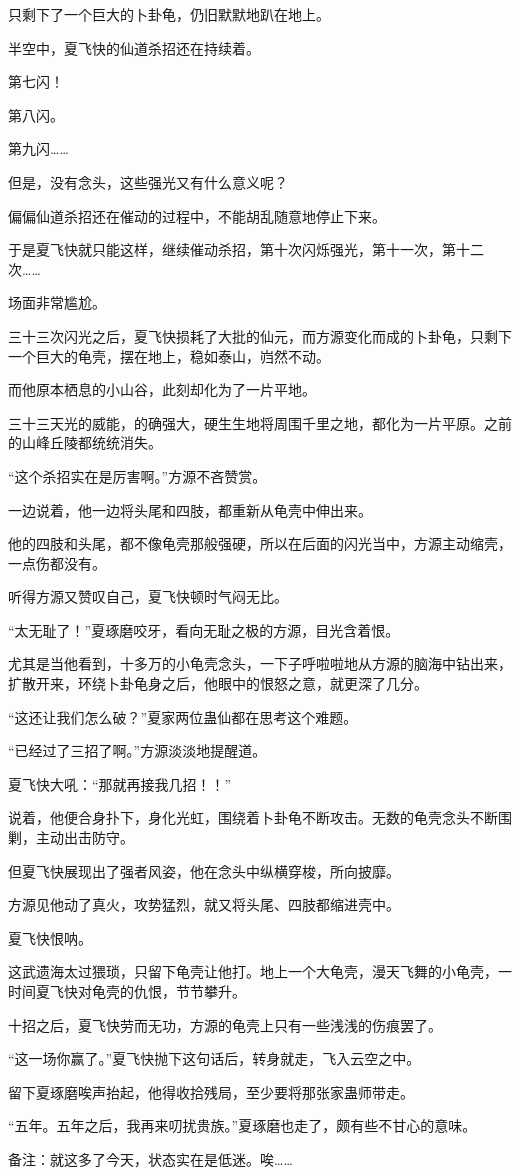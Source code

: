 \begin{this_body}
只剩下了一个巨大的卜卦龟，仍旧默默地趴在地上。

半空中，夏飞快的仙道杀招还在持续着。

第七闪！

第八闪。

第九闪……

但是，没有念头，这些强光又有什么意义呢？

偏偏仙道杀招还在催动的过程中，不能胡乱随意地停止下来。

于是夏飞快就只能这样，继续催动杀招，第十次闪烁强光，第十一次，第十二次……

场面非常尴尬。

三十三次闪光之后，夏飞快损耗了大批的仙元，而方源变化而成的卜卦龟，只剩下一个巨大的龟壳，摆在地上，稳如泰山，岿然不动。

而他原本栖息的小山谷，此刻却化为了一片平地。

三十三天光的威能，的确强大，硬生生地将周围千里之地，都化为一片平原。之前的山峰丘陵都统统消失。

“这个杀招实在是厉害啊。”方源不吝赞赏。

一边说着，他一边将头尾和四肢，都重新从龟壳中伸出来。

他的四肢和头尾，都不像龟壳那般强硬，所以在后面的闪光当中，方源主动缩壳，一点伤都没有。

听得方源又赞叹自己，夏飞快顿时气闷无比。

“太无耻了！”夏琢磨咬牙，看向无耻之极的方源，目光含着恨。

尤其是当他看到，十多万的小龟壳念头，一下子呼啦啦地从方源的脑海中钻出来，扩散开来，环绕卜卦龟身之后，他眼中的恨怒之意，就更深了几分。

“这还让我们怎么破？”夏家两位蛊仙都在思考这个难题。

“已经过了三招了啊。”方源淡淡地提醒道。

夏飞快大吼：“那就再接我几招！！”

说着，他便合身扑下，身化光虹，围绕着卜卦龟不断攻击。无数的龟壳念头不断围剿，主动出击防守。

但夏飞快展现出了强者风姿，他在念头中纵横穿梭，所向披靡。

方源见他动了真火，攻势猛烈，就又将头尾、四肢都缩进壳中。

夏飞快恨呐。

这武遗海太过猥琐，只留下龟壳让他打。地上一个大龟壳，漫天飞舞的小龟壳，一时间夏飞快对龟壳的仇恨，节节攀升。

十招之后，夏飞快劳而无功，方源的龟壳上只有一些浅浅的伤痕罢了。

“这一场你赢了。”夏飞快抛下这句话后，转身就走，飞入云空之中。

留下夏琢磨唉声抬起，他得收拾残局，至少要将那张家蛊师带走。

“五年。五年之后，我再来叨扰贵族。”夏琢磨也走了，颇有些不甘心的意味。

备注：就这多了今天，状态实在是低迷。唉……

\end{this_body}

